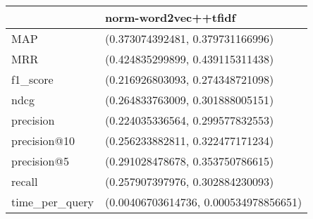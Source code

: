 \begin{tabular}{ll}
\toprule
{} &                   norm-word2vec++tfidf \\
\midrule
MAP            &       (0.373074392481, 0.379731166996) \\
MRR            &       (0.424835299899, 0.439115311438) \\
f1\_score       &       (0.216926803093, 0.274348721098) \\
ndcg           &       (0.264833763009, 0.301888005151) \\
precision      &       (0.224035336564, 0.299577832553) \\
precision@10   &       (0.256233882811, 0.322477171234) \\
precision@5    &       (0.291028478678, 0.353750786615) \\
recall         &       (0.257907397976, 0.302884230093) \\
time\_per\_query &  (0.00406703614736, 0.000534978856651) \\
\bottomrule
\end{tabular}

